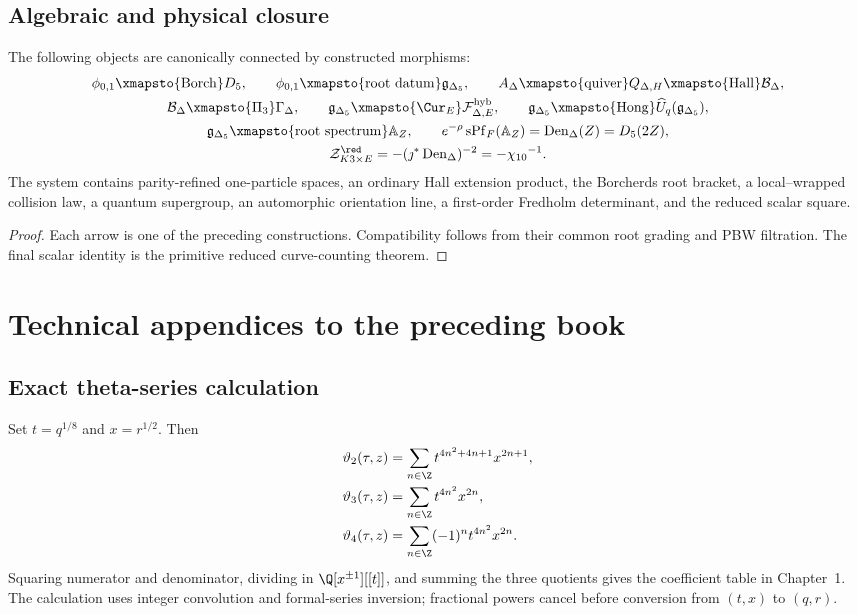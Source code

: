 \chapter{Algebraic and physical closure}
\begin{theorem}
The following objects are canonically connected by constructed morphisms:
\[
\begin{gathered}
 \phiweak\xmapsto{\mathrm{Borch}}\Dmon,
 \qquad
 \phiweak\xmapsto{\mathrm{root\ datum}}\gIg,
 \qquad
 A_\Delta\xmapsto{\mathrm{quiver}}Q_{\Delta,H}
 \xmapsto{\mathrm{Hall}}\mathcal B_\Delta,\\
 \mathcal B_\Delta\xmapsto{\Pi_3}\Gamma_\Delta,
 \qquad
 \gIg\xmapsto{\Cur_E}\mathcal F^{\mathrm{hyb}}_{\Delta,E},
 \qquad
 \gIg\xmapsto{\mathrm{Hong}}\widehat U_q(\gIg),\\
 \gIg\xmapsto{\mathrm{root\ spectrum}}\mathbb A_Z,
 \qquad
 e^{-\rho}\operatorname{sPf}_F(\mathbb A_Z)=\DenIg(Z)=\Dmon(2Z),\\
 \mathcal Z^{\red}_{K3\times E}=-(\jmath^*\DenIg)^{-2}=-\ChiTen^{-1}.
\end{gathered}
\]
The system contains parity-refined one-particle spaces, an ordinary Hall extension product, the Borcherds root bracket, a local--wrapped collision law, a quantum supergroup, an automorphic orientation line, a first-order Fredholm determinant, and the reduced scalar square.
\end{theorem}
\begin{proof}
Each arrow is one of the preceding constructions.  Compatibility follows from their common root grading and PBW filtration.  The final scalar identity is the primitive reduced curve-counting theorem.
\end{proof}


\part{Technical appendices to the preceding book}
\chapter{Exact theta-series calculation}\label{app:theta-computation}
Set $t=q^{1/8}$ and $x=r^{1/2}$. Then
\[
\begin{aligned}
\vartheta_2(\tau,z)&=\sum_{n\in\Z}t^{4n^2+4n+1}x^{2n+1},\\
\vartheta_3(\tau,z)&=\sum_{n\in\Z}t^{4n^2}x^{2n},\\
\vartheta_4(\tau,z)&=\sum_{n\in\Z}(-1)^nt^{4n^2}x^{2n}.
\end{aligned}
\]
Squaring numerator and denominator, dividing in $\Q[x^{\pm1}][[t]]$, and summing the three quotients gives the coefficient table in Chapter~1. The calculation uses integer convolution and formal-series inversion; fractional powers cancel before conversion from $(t,x)$ to $(q,r)$.

